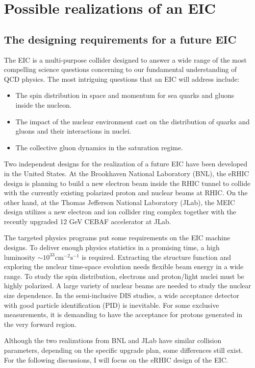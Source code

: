 \chapter{Possible realizations of an EIC} 
\label{chp:EIC}

\section{The designing requirements for a future EIC}
The EIC is a multi-purpose collider designed to answer a wide range
of the most compelling science questions concerning to our fundamental understanding of QCD physics. The most intriguing questions
that an EIC will address include:
\begin{itemize}
\item The spin distribution in space and momentum for sea quarks and gluons inside the nucleon.
\item The impact of the nuclear environment cast on the distribution of quarks and gluons and their interactions in nuclei.
\item The collective gluon dynamics in the saturation regime.
\end{itemize}
Two independent designs for the realization of a future EIC have been developed
in the United States. At the Brookhaven National Laboratory (BNL), the eRHIC
design is planning to build a new electron beam inside the RHIC tunnel to
collide with the currently existing polarized proton and nuclear beams at RHIC.
On the other hand, at the Thomas Jefferson National Laboratory (JLab), the MEIC
design utilizes a new electron and ion collider ring complex together with the
recently upgraded 12 GeV CEBAF accelerator at JLab.

The targeted physics programs put some requirements on the EIC machine designs.
To deliver enough physics statistics in a promising time, a high luminosity
$\sim 10^{33} \mathrm{cm}^{-2}\mathrm{s}^{-1}$ is required. Extracting the
structure function and exploring the nuclear time-space evolution needs flexible beam
energy in a wide range. To study the spin distribution, electrons and proton/light
nuclei must be highly polarized. A large variety of nuclear beams are needed to study
the nuclear size dependence. In the semi-inclusive DIS studies, a wide acceptance
detector with good particle identification (PID) is inevitable. For some exclusive
measurements, it is demanding to have the acceptance for protons generated in the
very forward region.

Although the two realizations from BNL and JLab have similar collision parameters,
depending on the specific upgrade plan, some differences still exist. For the following
discussions, I will focus on the eRHIC design of the EIC. 


